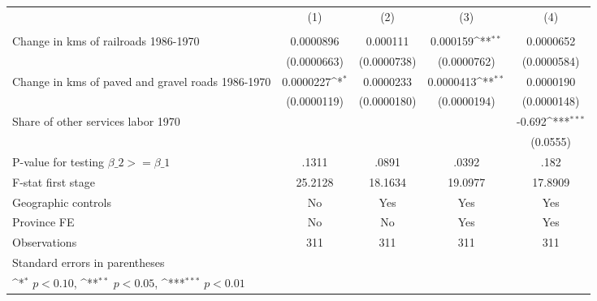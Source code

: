 {
\def\sym#1{\ifmmode^{#1}\else\(^{#1}\)\fi}
\begin{tabular}{l*{4}{c}}
\hline\hline
                &\multicolumn{1}{c}{(1)}&\multicolumn{1}{c}{(2)}&\multicolumn{1}{c}{(3)}&\multicolumn{1}{c}{(4)}\\
                &\multicolumn{1}{c}{}&\multicolumn{1}{c}{}&\multicolumn{1}{c}{}&\multicolumn{1}{c}{}\\
\hline
Change in kms of railroads 1986-1970&0.0000896         & 0.000111         & 0.000159\sym{**} &0.0000652         \\
                &(0.0000663)         &(0.0000738)         &(0.0000762)         &(0.0000584)         \\
[1em]
Change in kms of paved and gravel roads 1986-1970&0.0000227\sym{*}  &0.0000233         &0.0000413\sym{**} &0.0000190         \\
                &(0.0000119)         &(0.0000180)         &(0.0000194)         &(0.0000148)         \\
[1em]
Share of other services labor 1970&                  &                  &                  &   -0.692\sym{***}\\
                &                  &                  &                  & (0.0555)         \\
\hline
P-value for testing $\beta\_{2} >= \beta\_{1}$&    .1311         &    .0891         &    .0392         &     .182         \\
F-stat first stage&  25.2128         &  18.1634         &  19.0977         &  17.8909         \\
Geographic controls&       No         &      Yes         &      Yes         &      Yes         \\
Province FE     &       No         &       No         &      Yes         &      Yes         \\
Observations    &      311         &      311         &      311         &      311         \\
\hline\hline
\multicolumn{5}{l}{\footnotesize Standard errors in parentheses}\\
\multicolumn{5}{l}{\footnotesize \sym{*} \(p<0.10\), \sym{**} \(p<0.05\), \sym{***} \(p<0.01\)}\\
\end{tabular}
}
